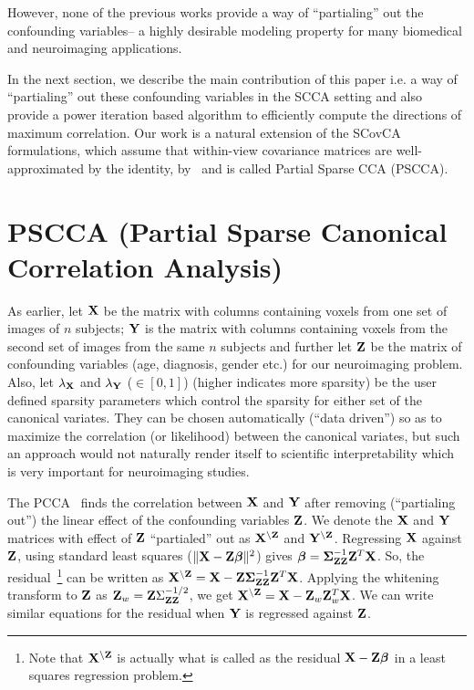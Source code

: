 \documentclass{llncs}
\newcommand{\X}{{\bf X}}
\newcommand{\Y}{{\bf Y}}
\newcommand{\Z}{{\bf Z}}
\newcommand{\bs}{\boldsymbol}
\begin{document}
However, none of the previous works provide a way of ``partialing'' out the confounding variables-- a highly desirable modeling property for many biomedical and neuroimaging applications. 

In the next section, we describe the main contribution of this paper
i.e. a way of ``partialing'' out these confounding variables in the
SCCA setting and also provide a power iteration based algorithm to
efficiently compute the directions of maximum correlation. Our work is
a natural extension of the SCovCA formulations, which assume that
within-view covariance matrices are well-approximated by the identity, by~\cite{parkhomenko,witten}
and is called Partial Sparse CCA (PSCCA).  


\section{PSCCA (Partial Sparse Canonical Correlation Analysis)}
As earlier, let $\X$ be the matrix with columns containing voxels from one set of
images of $n$ subjects; $\Y$ is the matrix with columns containing voxels from the second
set of images from the same $n$ subjects and further let $\Z$ be the matrix of confounding variables (age, diagnosis, gender etc.) for our neuroimaging problem. Also, let $\lambda_{\X}$ and $\lambda_{\Y}$ ($\in [0,1]$) (higher indicates more sparsity) be the user defined sparsity parameters which control the sparsity for either set of the canonical variates. They can be chosen automatically (``data driven'') so as to maximize the correlation (or likelihood) between the canonical variates, but such an approach would not naturally render itself  to scientific interpretability which is very important for neuroimaging studies. 

The PCCA~\cite{timm} finds the correlation between $\X$ and $\Y$ after removing (``partialing out'') the linear effect of the confounding variables $\Z$. 
We denote the $\X$ and $\Y$ matrices with effect of $\Z$ ``partialed'' out as $\X^{\backslash\Z}$ and $\Y^{\backslash\Z}$. Regressing $\X$ against $\Z$, using standard least squares ($\|\X -\Z\bs\beta\|^2$) gives $\bs\beta=  \bs\Sigma_{\Z\Z}^{-1}\Z^T\X$. So, the residual~\footnote{Note that $\X^{\backslash\Z}$ is actually what is called as the residual $\X-\Z\bs\beta$ in a least squares regression problem.} can be written as  $\X^{\backslash\Z}=\X - \Z\bs\Sigma_{\Z\Z}^{-1}\Z^T\X$. Applying the whitening transform to $\Z$  as $\Z_w =\Z \Sigma_{\Z\Z}^{-1/2}$, we get $\X^{\backslash\Z}=\X - \Z_w\Z_w^T\X$.
We can write similar equations for the residual when $\Y$ is regressed against $\Z$.
 
\end{document}
